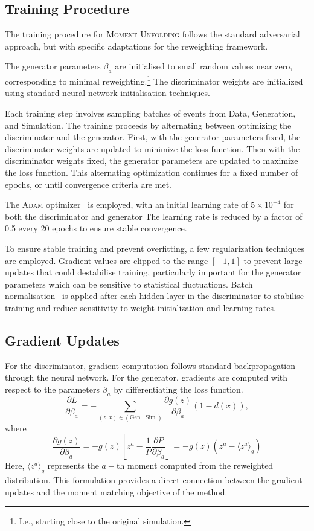     \subsection{Training Procedure}
        The training procedure for \textsc{Moment Unfolding} follows the standard adversarial approach, but with specific adaptations for the reweighting framework.
        
        The generator parameters $\beta_a$ are initialised to small random values near zero, corresponding to minimal reweighting.\footnote{I.e., starting close to the original simulation.}
        The discriminator weights are initialized using standard neural network initialisation techniques\cite{7410480}.
        
        Each training step involves sampling batches of events from Data, Generation, and Simulation.
        The training proceeds by alternating between optimizing the discriminator and the generator.
        First, with the generator parameters fixed, the discriminator weights are updated to minimize the loss function.
        Then with the discriminator weights fixed, the generator parameters are updated to maximize the loss function.
        This alternating optimization continues for a fixed number of epochs, or until convergence criteria are met.

        The \textsc{Adam} optimizer~\cite{kingma_adam_2017} is employed, with an initial learning rate of $5 \times 10^{-4}$ for both the discriminator and generator
        The learning rate is reduced by a factor of 0.5 every 20 epochs to ensure stable convergence.

        To ensure stable training and prevent overfitting, a few regularization techniques are employed.
        Gradient values are clipped to the range $[-1, 1]$ to prevent large updates that could destabilise training, particularly important for the generator parameters which can be sensitive to statistical fluctuations.
        Batch normalisation~\cite{Ioffe2015BatchShift} is applied after each hidden layer in the discriminator to stabilise training and reduce sensitivity to weight initialization and learning rates.
    \subsection{Gradient Updates}
        For the discriminator, gradient computation follows standard backpropagation through the neural network.
        For the generator, gradients are computed with respect to the parameters $\beta_a$ by differentiating the loss function.
        \[ 
            \frac{\partial L}{\partial \beta_a} = -\sum_{(z,x) \in (\text{Gen., Sim.})} \frac{\partial g(z)}{\partial \beta_a}(1-d(x)),
        \]
        where
        \[
            \frac{\partial g(z)}{\partial \beta_a} = -g(z)\left[z^a - \frac{1}{P}\frac{\partial P}{\partial \beta_a}\right] = -g(z)(z^a - \langle z^a \rangle_{g})
        \]
        Here, $\langle z^a \rangle_{g}$ represents the $a-$th moment computed from the reweighted distribution.
        This formulation provides a direct connection between the gradient updates and the moment matching objective of the method.
        
